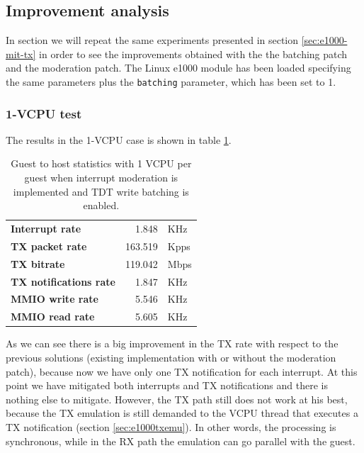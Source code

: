 \subsection{Improvement analysis}
\label{sec:e1000-mit-bat-tx}
In section we will repeat the same experiments presented in section \ref{sec:e1000-mit-tx} in order to see the improvements
obtained with the the batching patch and the moderation patch. The Linux e1000 module has been loaded specifying the same parameters 
plus the \texttt{batching} parameter, which has been set to 1.

\subsubsection{1-VCPU test}
The results in the 1-VCPU case is shown in table \ref{tab:e1000-mit-bat-tx-g2h1vcpu}.

\begin{table}
\begin{center}
\begin{tabular}{lrl}
\toprule
\textbf{Interrupt rate} & 1.848 & KHz\\
\textbf{TX packet rate} & 163.519 & Kpps\\
\textbf{TX bitrate} & 119.042 & Mbps\\
\textbf{TX notifications rate} & 1.847 & KHz\\
\textbf{MMIO write rate} & 5.546 & KHz\\
\textbf{MMIO read rate} & 5.605 & KHz\\
\bottomrule
\end{tabular}
\end{center}
\caption{Guest to host statistics with 1 VCPU per guest when interrupt moderation is implemented and TDT write batching is enabled.}
\label{tab:e1000-mit-bat-tx-g2h1vcpu}
\end{table}

As we can see there is a big improvement in the TX rate with respect to the previous solutions (existing implementation with or without
the moderation patch), because now we have only one TX notification for each interrupt. At this point we have mitigated
both interrupts and TX notifications and there is nothing else to mitigate.
However, the TX path still does not work at his best, because the TX emulation is still demanded to the VCPU thread that executes a
TX notification (section \ref{sec:e1000txemu}). In other words, the processing is synchronous, while in the RX path the emulation can 
go parallel with the guest.


